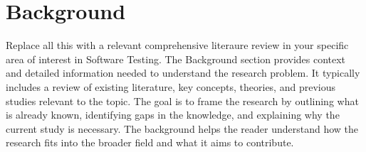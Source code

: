 \section{Background}
\label{Background}

Replace all this with a relevant comprehensive literaure review in your specific area of interest in Software Testing.  The Background section provides context and detailed information needed to understand the research problem. It typically includes a review of existing literature, key concepts, theories, and previous studies relevant to the topic. The goal is to frame the research by outlining what is already known, identifying gaps in the knowledge, and explaining why the current study is necessary. The background helps the reader understand how the research fits into the broader field and what it aims to contribute.
